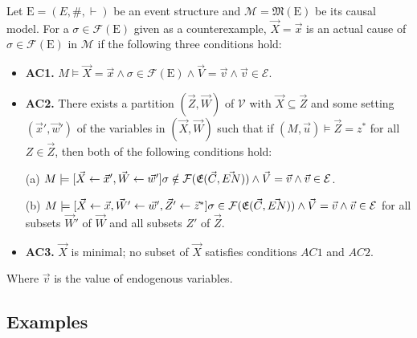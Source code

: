 \begin{definition}
    Let $\mathrm{E} = (E,\#,\vdash)$ be an event structure and
    $\mathcal{M} = \mathfrak{M}(\mathrm{E})$ be its causal model.
    For a $\sigma \in \mathcal{F}(\mathrm{E})$ given as a counterexample,
    $\vec X = \vec x$ is an actual cause of
    $\sigma \in \mathcal{F}(\mathrm{E})$ in $\mathcal{M}$ if the following three conditions hold:
    \begin{itemize}
        \item  \textbf{AC1.} $M\models \vec X = \vec x \wedge
                  \sigma \in \mathcal{F}(\mathrm{E})
                  \wedge \vec V = \vec v
                  \wedge \vec v \in \mathcal{E}$.
        \item  \textbf{AC2. }There exists a partition $(\vec Z, \vec W)$ of $\mathcal{V}$ with $\vec X \subseteq \vec Z$ and some setting $(\vec x',\vec w')$ of the variables in $(\vec X,\vec W)$ such that if $(M,\vec u)\models \vec Z = z^*$ for all $Z\in \vec Z$, then both of the following conditions hold:

              (a) $M \models[\vec X \leftarrow \vec x', \vec W \leftarrow \vec w']
                  \sigma \notin \mathcal{F}(\mathfrak{E}(\vec C,\vec {EN}))
                  \wedge \vec V = \vec v
                  \wedge  \vec v \in \mathcal{E}$.

              (b) $M \models[\vec X\leftarrow \vec x, \vec W' \leftarrow \vec w', \vec Z'\leftarrow \vec z^*]
                  \sigma \in \mathcal{F}(\mathfrak{E}(\vec C,\vec {EN})) 
                  \wedge \vec V = \vec v
                  \wedge \vec v \in \mathcal{E}$ 
                  for all subsets $\vec W'$ of $\vec W$ and all subsets $Z'$ of $\vec Z$.

        \item  \textbf{AC3.} $\vec X$ is minimal; no subset of $\vec X$ satisfies conditions $AC1$ and $AC2$.
    \end{itemize}
    Where $\vec v$ is the value of endogenous variables.
\end{definition}
\pagebreak
\subsection{Examples}
